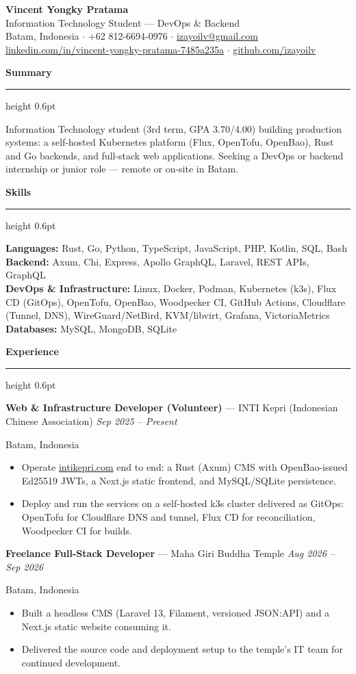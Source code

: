 \documentclass[10pt,a4paper]{article}
\newcommand{\cvsection}[1]{%
  \vspace{3pt}%
  {\large\bfseries #1}\par\vspace{1pt}%
  \hrule height 0.6pt\vspace{2pt}%
}
\newcommand{\cventry}[4]{%
  \textbf{#1} --- #2 \hfill \textit{#4}\par
  {\small #3}\par
}
\begin{document}
\begin{center}
  {\fontsize{20}{24}\selectfont\bfseries Vincent Yongky Pratama}\\[3pt]
  {\normalsize Information Technology Student --- DevOps \& Backend}\\[3pt]
  {\small
  Batam, Indonesia $\cdot$ +62 812-6694-0976 $\cdot$
  \href{mailto:izayoilv@gmail.com}{izayoilv@gmail.com}\\
  \href{https://www.linkedin.com/in/vincent-yongky-pratama-7485a235a}{linkedin.com/in/vincent-yongky-pratama-7485a235a} $\cdot$
  \href{https://github.com/izayoilv}{github.com/izayoilv}}
\end{center}

\cvsection{Summary}

Information Technology student (3rd term, GPA 3.70/4.00) building
production systems: a self-hosted Kubernetes platform (Flux, OpenTofu,
OpenBao), Rust and Go backends, and full-stack web applications. Seeking a
DevOps or backend internship or junior role --- remote or on-site in Batam.

\cvsection{Skills}

\textbf{Languages:} Rust, Go, Python, TypeScript, JavaScript, PHP, Kotlin, SQL, Bash\\
\textbf{Backend:} Axum, Chi, Express, Apollo GraphQL, Laravel, REST APIs, GraphQL\\
\textbf{DevOps \& Infrastructure:} Linux, Docker, Podman, Kubernetes (k3s), Flux CD (GitOps), OpenTofu, OpenBao, Woodpecker CI, GitHub Actions, Cloudflare (Tunnel, DNS), WireGuard/NetBird, KVM/libvirt, Grafana, VictoriaMetrics\\
\textbf{Databases:} MySQL, MongoDB, SQLite

\cvsection{Experience}

\cventry{Web \& Infrastructure Developer (Volunteer)}{INTI Kepri (Indonesian Chinese Association)}{Batam, Indonesia}{Sep 2025 -- Present}
\begin{itemize}
  \item Operate \href{https://intikepri.com}{intikepri.com} end to end: a Rust (Axum) CMS with OpenBao-issued Ed25519 JWTs, a Next.js static frontend, and MySQL/SQLite persistence.
  \item Deploy and run the services on a self-hosted k3s cluster delivered as GitOps: OpenTofu for Cloudflare DNS and tunnel, Flux CD for reconciliation, Woodpecker CI for builds.
\end{itemize}

\cventry{Freelance Full-Stack Developer}{Maha Giri Buddha Temple}{Batam, Indonesia}{Aug 2026 -- Sep 2026}
\begin{itemize}
  \item Built a headless CMS (Laravel 13, Filament, versioned JSON:API) and a Next.js static website consuming it.
  \item Delivered the source code and deployment setup to the temple's IT team for continued development.
\end{itemize}
\end{document}
